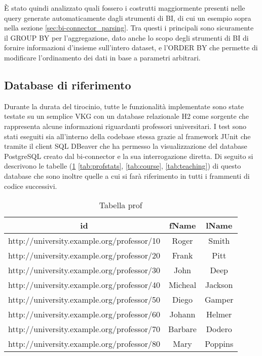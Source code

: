 \`E stato quindi analizzato quali fossero i costrutti maggiormente presenti nelle query generate automaticamente dagli strumenti di BI, di cui un esempio sopra nella sezione \ref{sec:bi-connector_parsing}. Tra questi
i principali sono sicuramente il GROUP BY per l'aggregazione, dato anche lo scopo degli strumenti di BI di fornire informazioni d'insieme sull'intero dataset, e l'ORDER BY che
permette di modificare l'ordinamento dei dati in base a parametri arbitrari.

\subsection{Database di riferimento}
Durante la durata del tirocinio, tutte le funzionalità implementate sono state testate su un semplice VKG con un database relazionale H2 come sorgente che rappresenta alcune informazioni riguardanti professori universitari.
I test sono stati eseguiti sia all'interno della codebase stessa grazie al framework JUnit che tramite il client SQL DBeaver che ha permesso la visualizzazione del database PostgreSQL creato dal bi-connector e la sua
interrogazione diretta.
Di seguito si descrivono le tabelle (\ref{tab:prof} \ref{tab:profstats}, \ref{tab:course}, \ref{tab:teaching}) di questo database che sono inoltre quelle a cui si farà riferimento in tutti i frammenti di codice successivi.
\begin{table}[ht]
    \caption{Tabella prof}
    \label{tab:prof}
    \centering
    \begin{tabular}{ | c | c | c | }
        \hline
        id                                         & fName   & lName   \\ \hline
        http://university.example.org/professor/10 & Roger   & Smith   \\ \hline
        http://university.example.org/professor/20 & Frank   & Pitt    \\ \hline
        http://university.example.org/professor/30 & John    & Deep    \\ \hline
        http://university.example.org/professor/40 & Micheal & Jackson \\ \hline
        http://university.example.org/professor/50 & Diego   & Gamper  \\ \hline
        http://university.example.org/professor/60 & Johann  & Helmer  \\ \hline
        http://university.example.org/professor/70 & Barbare & Dodero  \\ \hline
        http://university.example.org/professor/80 & Mary    & Poppins \\ \hline
    \end{tabular}
\end{table}

